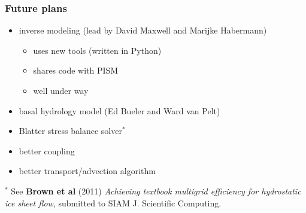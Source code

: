 \documentclass[hide notes,intlimits]{beamer}
\begin{document}
\begin{frame}
  \frametitle{Future plans}
  \begin{itemize}
  \item inverse modeling (lead by David Maxwell and Marijke Habermann)
    \begin{itemize}
    \item uses new tools (written in Python)
    \item shares code with PISM
    \item well under way
    \end{itemize}
  \item basal hydrology model (Ed Bueler and Ward van Pelt)
  \item Blatter stress balance solver$^{*}$
  \item better coupling
  \item better transport/advection algorithm
  \end{itemize}

 \begin{flushleft}
   \tiny
    $^{*}$ See \textbf{Brown et al} (2011)
    \emph{Achieving textbook multigrid efficiency for hydrostatic ice sheet
      flow}, submitted to SIAM J. Scientific Computing.
  \end{flushleft}
\end{frame}
\end{document}
